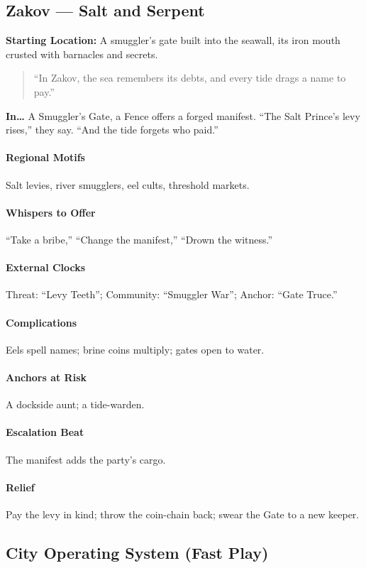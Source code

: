 \subsection*{Zakov — Salt and Serpent}
\textbf{Starting Location:} A smuggler’s gate built into the seawall, its iron mouth crusted with barnacles and secrets.
\begin{quote}
“In Zakov, the sea remembers its debts, and every tide drags a name to pay.”
\end{quote}

\textbf{In…} A Smuggler’s Gate, a Fence offers a forged manifest. ``The Salt Prince’s levy rises,'' they say. ``And the tide forgets who paid.''
\paragraph{Regional Motifs} Salt levies, river smugglers, eel cults, threshold markets.
\paragraph{Whispers to Offer} ``Take a bribe,'' ``Change the manifest,'' ``Drown the witness.''
\paragraph{External Clocks} Threat: ``Levy Teeth''; Community: ``Smuggler War''; Anchor: ``Gate Truce.''
\paragraph{Complications} Eels spell names; brine coins multiply; gates open to water.
\paragraph{Anchors at Risk} A dockside aunt; a tide-warden.
\paragraph{Escalation Beat} The manifest adds the party’s cargo.
\paragraph{Relief} Pay the levy in kind; throw the coin-chain back; swear the Gate to a new keeper.

\subsection*{City Operating System (Fast Play)}

